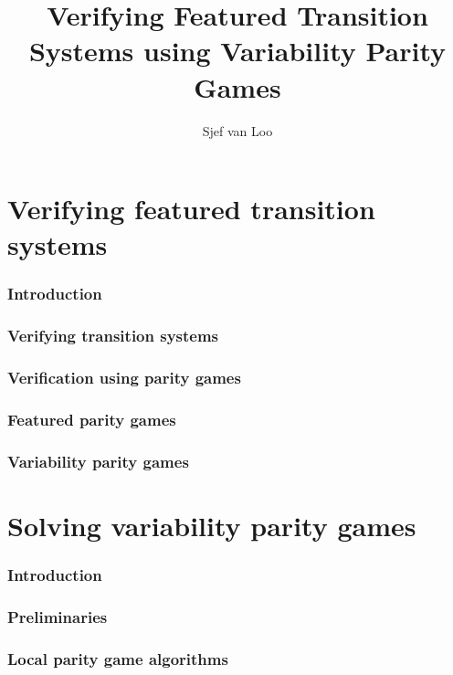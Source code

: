 \documentclass[]{article}
\title{Verifying Featured Transition Systems using Variability Parity Games}
\author{Sjef van Loo}
\begin{document}
\maketitle

\tableofcontents

\part{Verifying featured transition systems}
\label{part:verifying}
\section{Introduction}


\section{Verifying transition systems}


\section{Verification using parity games}


\section{Featured parity games}


\section{Variability parity games}

\pagebreak
\part{Solving variability parity games}
\section{Introduction}


\section{Preliminaries}


\section{Local parity game algorithms}

\end{document}
